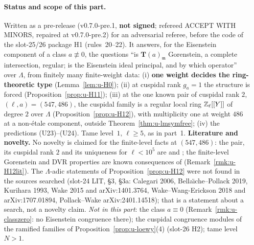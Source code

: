 \documentclass[11pt]{article}
\newcommand{\Iw}{\Lambda}                         %
\newcommand{\Tu}{\mathbf{T}}                      %
\newcommand{\Zl}{\Z_\ell}
\begin{document}
\paragraph{Status and scope of this part.} Written as a pre-release (v0.7.0-pre.1, \textbf{not signed}; refereed ACCEPT WITH MINORS, repaired at v0.7.0-pre.2) for an adversarial referee, before the code of the
slot-25/26 package H1 (rules~20--22). It answers, for the Eisenstein component of a class $a\not\equiv0$, the questions ``is $\Tu(a)_{\mathfrak m}$ Gorenstein, a complete
intersection, regular; is the Eisenstein ideal principal, and by which operator'' over $\Iw$, from finitely many finite-weight data: (i) \textbf{one weight decides the ring-theoretic
type} (Lemma~\ref{lem:u-H0}); (ii) at cuspidal rank $g_a=1$ the structure is forced (Proposition~\ref{prop:u-H11}); (iii) at the one known pair of cuspidal rank $2$,
$(\ell,a)=(547,486)$, the cuspidal family is a regular local ring $\Zl[[Y]]$ of degree $2$ over $\Iw$ (Proposition~\ref{prop:u-H12}), with multiplicity one at weight $486$ at a
non-étale component, outside Theorem~\ref{thm:u-lmsymfree}; (iv) the predictions (U23)--(U24). Tame level~$1$, $\ell\ge5$, as in part~1.
\textbf{Literature and novelty.} No novelty is claimed for the finite-level facts at $(547,486)$: the pair, its cuspidal rank $2$ and its uniqueness for $\ell<10^{5}$ are
\cite[p.~68]{calegari_eisdef} and \cite[\S1.1]{bellaiche_pollack}; the finite-level Gorenstein and DVR properties are known consequences of \cite{kurihara1993}
(Remark~\ref{rmk:u-H12lit}). The $\Iw$-adic statements of Proposition~\ref{prop:u-H12} were not found in the sources searched (slot-24 LIT, 
\S3, \S3a: Calegari 2006, Bella\"\i che--Pollack 2019, Kurihara 1993, Wake 2015 and arXiv:1401.3764, Wake--Wang-Erickson 2018 and arXiv:1707.01894, Pollack--Wake arXiv:2401.14518);
that is a statement about a search, not a novelty claim. \emph{Not in this part}: the class $a\equiv0$ (Remark~\ref{rmk:u-classzero}: no Eisenstein congruence there); the
cuspidal congruence modules of the ramified families of Proposition~\ref{prop:u-loewy}(4) (slot-26 H2); tame level $N>1$.
\end{document}
